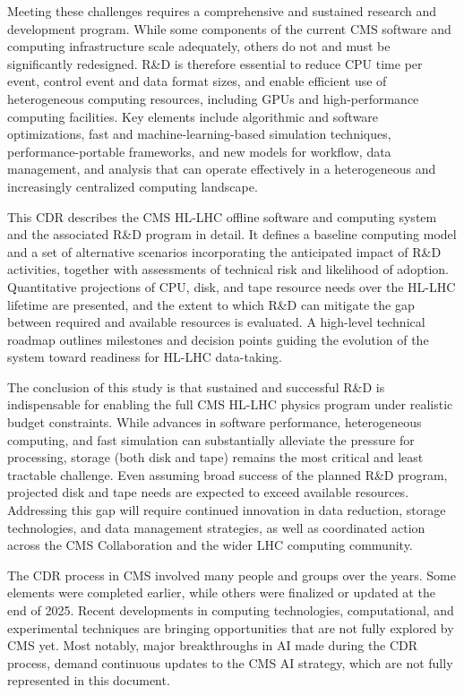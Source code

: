 Meeting these challenges requires a comprehensive and sustained research and development program. While some components of the current CMS software and computing infrastructure scale adequately, others do not and must be significantly redesigned. R\&D is therefore essential to reduce CPU time per event, control event and data format sizes, and enable efficient use of heterogeneous computing resources, including GPUs and high-performance computing facilities. Key elements include algorithmic and software optimizations, fast and machine-learning-based simulation techniques, performance-portable frameworks, and new models for workflow, data management, and analysis that can operate effectively in a heterogeneous and increasingly centralized computing landscape.

This \gls{CDR} describes the CMS HL-LHC offline software and computing system and the associated R\&D program in detail. It defines a baseline computing model and a set of alternative scenarios incorporating the anticipated impact of R\&D activities, together with assessments of technical risk and likelihood of adoption. Quantitative projections of CPU, disk, and tape resource needs over the HL-LHC lifetime are presented, and the extent to which R\&D can mitigate the gap between required and available resources is evaluated. A high-level technical roadmap outlines milestones and decision points guiding the evolution of the system toward readiness for HL-LHC data-taking.

The conclusion of this study is that sustained and successful R\&D is indispensable for enabling the full CMS HL-LHC physics program under realistic budget constraints. While advances in software performance, heterogeneous computing, and fast simulation can substantially alleviate the pressure for processing, storage (both disk and tape) remains the most critical and least tractable challenge. Even assuming broad success of the planned R\&D program, projected disk and tape needs are expected to exceed available resources. Addressing this gap will require continued innovation in data reduction, storage technologies, and data management strategies, as well as coordinated action across the CMS Collaboration and the wider LHC computing community.

The \gls{CDR} process in CMS involved many people and groups over the years. Some elements were completed earlier, while others were finalized or updated at the end of 2025. Recent developments in computing technologies, computational, and
experimental techniques are bringing opportunities that are not fully
explored by CMS yet. Most notably, major breakthroughs in \gls{AI} made during the CDR process, demand continuous updates to the CMS \gls{AI} strategy, which are not fully represented in this document. 
 
